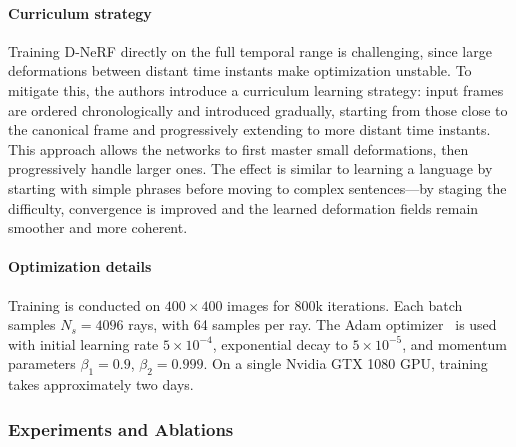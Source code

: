 \begin{enrichment}
\begin{enrichment}
    \paragraph{Curriculum strategy}
    \noindent
    Training D-NeRF directly on the full temporal range is challenging, since large deformations between distant time instants make optimization unstable.
    To mitigate this, the authors introduce a curriculum learning strategy: input frames are ordered chronologically and introduced gradually, starting from those close to the canonical frame and progressively extending to more distant time instants.
    This approach allows the networks to first master small deformations, then progressively handle larger ones.
    The effect is similar to learning a language by starting with simple phrases before moving to complex sentences—by staging the difficulty, convergence is improved and the learned deformation fields remain smoother and more coherent.
    
    \paragraph{Optimization details}
    \noindent
    Training is conducted on $400\times400$ images for 800k iterations.
    Each batch samples $N_s = 4096$ rays, with 64 samples per ray.
    The Adam optimizer~\cite{kingma2017_adam} is used with initial learning rate $5\!\times\!10^{-4}$, exponential decay to $5\!\times\!10^{-5}$, and momentum parameters $\beta_1=0.9$, $\beta_2=0.999$.
    On a single Nvidia GTX 1080 GPU, training takes approximately two days.
    
    \newpage
    
    \subsubsection{Experiments and Ablations}
    \label{subsec:chapter23_dnerf_experiments}
    

\end{enrichment}
\end{enrichment}
